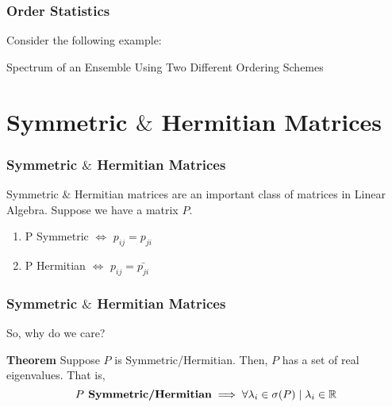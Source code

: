 
\begin{frame} \frametitle{Order Statistics}

Consider the following example:

{Spectrum of an Ensemble Using Two Different Ordering Schemes}

\end{frame}

\section{Symmetric $\&$ Hermitian Matrices}

\begin{frame} \frametitle{Symmetric $\&$ Hermitian Matrices}

Symmetric $\&$ Hermitian matrices are an important class of matrices in Linear Algebra.
Suppose we have a matrix $P$.

\begin{enumerate}
  \item P Symmetric $\iff$ $p_{ij} = p_{ji}$
  \item P Hermitian $\iff$ $p_{ij} = \bar{p_{ji}}$
\end{enumerate}


\end{frame}

\begin{frame} \frametitle{Symmetric $\&$ Hermitian Matrices}

So, why do we care?

\begin{alertblock}{\textbf{Theorem}}
Suppose $P$ is Symmetric/Hermitian. Then, $P$ has a set of real eigenvalues. That is,
$$P \textbf{ Symmetric/Hermitian} \implies \forall \lambda_i \in \sigma(P) \mid \lambda_i \in \mathbb{R}$$
\end{alertblock}

\end{frame}

